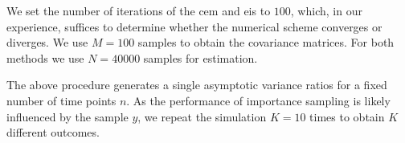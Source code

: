 
We set the number of iterations of the \gls{cem} and \gls{eis} to $100$, which, in our experience, suffices to determine whether the numerical scheme converges or diverges. We use $M=100$ samples to obtain the covariance matrices. For both methods we use $N = 40000$ samples for estimation.  

The above procedure generates a single asymptotic variance ratios for a fixed number of time points $n$. As the performance of importance sampling is likely influenced by the sample $y$, we repeat the simulation $K=10$ times to obtain $K$ different outcomes. 
